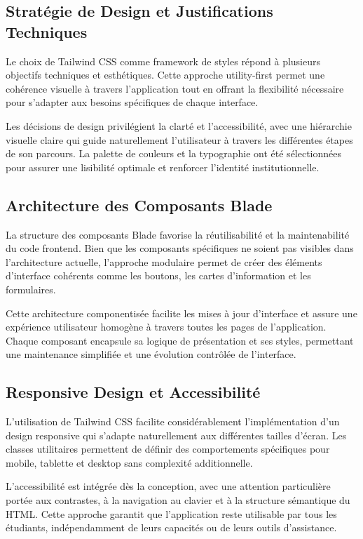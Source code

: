 \documentclass[12pt,a4paper]{report}
\begin{document}
\subsection{Stratégie de Design et Justifications Techniques}

Le choix de Tailwind CSS comme framework de styles répond à plusieurs objectifs techniques et esthétiques. Cette approche utility-first permet une cohérence visuelle à travers l'application tout en offrant la flexibilité nécessaire pour s'adapter aux besoins spécifiques de chaque interface.

Les décisions de design privilégient la clarté et l'accessibilité, avec une hiérarchie visuelle claire qui guide naturellement l'utilisateur à travers les différentes étapes de son parcours. La palette de couleurs et la typographie ont été sélectionnées pour assurer une lisibilité optimale et renforcer l'identité institutionnelle.

\subsection{Architecture des Composants Blade}

La structure des composants Blade favorise la réutilisabilité et la maintenabilité du code frontend. Bien que les composants spécifiques ne soient pas visibles dans l'architecture actuelle, l'approche modulaire permet de créer des éléments d'interface cohérents comme les boutons, les cartes d'information et les formulaires.

Cette architecture componentisée facilite les mises à jour d'interface et assure une expérience utilisateur homogène à travers toutes les pages de l'application. Chaque composant encapsule sa logique de présentation et ses styles, permettant une maintenance simplifiée et une évolution contrôlée de l'interface.

\subsection{Responsive Design et Accessibilité}

L'utilisation de Tailwind CSS facilite considérablement l'implémentation d'un design responsive qui s'adapte naturellement aux différentes tailles d'écran. Les classes utilitaires permettent de définir des comportements spécifiques pour mobile, tablette et desktop sans complexité additionnelle.

L'accessibilité est intégrée dès la conception, avec une attention particulière portée aux contrastes, à la navigation au clavier et à la structure sémantique du HTML. Cette approche garantit que l'application reste utilisable par tous les étudiants, indépendamment de leurs capacités ou de leurs outils d'assistance.
\end{document}
